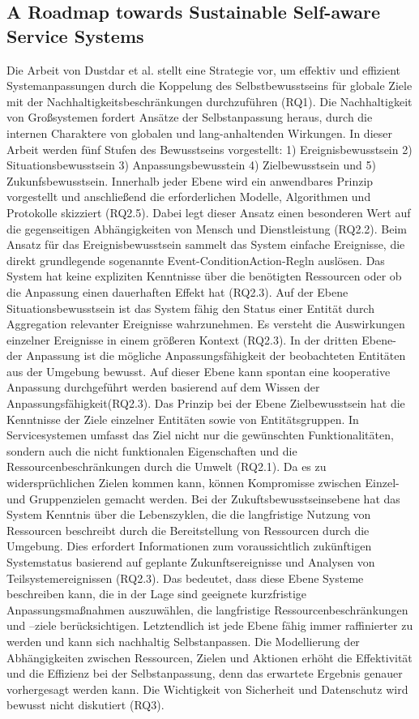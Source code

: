 \documentclass[conference,compsoc]{IEEEtran}
\begin{document}
\subsection{A Roadmap towards Sustainable Self-aware Service Systems}
Die Arbeit von Dustdar et al. \cite{dustdar2010roadmap} stellt eine Strategie vor, um effektiv und effizient Systemanpassungen  durch die Koppelung des Selbstbewusstseins für globale Ziele mit der Nachhaltigkeitsbeschränkungen durchzuführen (RQ1). Die Nachhaltigkeit von Großsystemen fordert Ansätze der Selbstanpassung heraus, durch die internen Charaktere von globalen und lang-anhaltenden Wirkungen. In dieser Arbeit werden fünf Stufen des Bewusstseins vorgestellt: 1) Ereignisbewusstsein 2) Situationsbewusstsein 3) Anpassungsbewusstein 4) Zielbewusstsein und 5) Zukunfsbewusstsein. Innerhalb jeder Ebene wird ein anwendbares Prinzip vorgestellt und anschließend die erforderlichen Modelle, Algorithmen und Protokolle skizziert (RQ2.5). Dabei legt dieser Ansatz einen besonderen Wert auf die gegenseitigen Abhängigkeiten von Mensch und Dienstleistung (RQ2.2). Beim Ansatz für das Ereignisbewusstsein sammelt das System einfache Ereignisse, die direkt grundlegende sogenannte Event-ConditionAction-Regln auslösen. Das System hat keine expliziten Kenntnisse über die benötigten Ressourcen oder ob die Anpassung einen dauerhaften Effekt hat (RQ2.3). Auf der Ebene Situationsbewusstsein ist das System fähig den Status einer Entität durch Aggregation relevanter Ereignisse wahrzunehmen. Es versteht die Auswirkungen einzelner Ereignisse in einem größeren Kontext (RQ2.3). In der dritten Ebene- der Anpassung ist die mögliche Anpassungsfähigkeit der beobachteten Entitäten aus der Umgebung bewusst. Auf dieser Ebene kann spontan eine kooperative Anpassung durchgeführt werden basierend auf dem Wissen der Anpassungsfähigkeit(RQ2.3). Das Prinzip bei der Ebene Zielbewusstsein hat die Kenntnisse der Ziele einzelner Entitäten sowie von Entitätsgruppen. In Servicesystemen umfasst das Ziel nicht nur die gewünschten Funktionalitäten, sondern auch die nicht funktionalen Eigenschaften und die Ressourcenbeschränkungen durch die Umwelt (RQ2.1). Da es zu widersprüchlichen Zielen kommen kann, können Kompromisse zwischen Einzel- und Gruppenzielen gemacht werden. Bei der Zukuftsbewusstseinsebene hat das System Kenntnis über die Lebenszyklen, die die langfristige Nutzung von Ressourcen beschreibt durch die Bereitstellung von Ressourcen durch die Umgebung. Dies erfordert Informationen zum voraussichtlich zukünftigen Systemstatus basierend auf geplante Zukunftsereignisse und Analysen von Teilsystemereignissen (RQ2.3). Das bedeutet, dass diese Ebene Systeme beschreiben kann, die in der Lage sind geeignete kurzfristige Anpassungsmaßnahmen auszuwählen, die langfristige Ressourcenbeschränkungen und –ziele berücksichtigen. Letztendlich ist jede Ebene fähig immer raffinierter zu werden und kann sich nachhaltig Selbstanpassen. Die Modellierung der Abhängigkeiten zwischen Ressourcen, Zielen und Aktionen erhöht die Effektivität und die Effizienz bei der Selbstanpassung, denn das erwartete Ergebnis genauer vorhergesagt werden kann. Die Wichtigkeit von Sicherheit und Datenschutz wird bewusst nicht diskutiert (RQ3).
\end{document}

